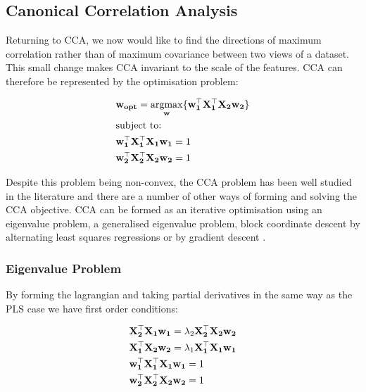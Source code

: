 \subsection{Canonical Correlation Analysis}\label{sec:cca}

Returning to CCA, we now would like to find the directions of maximum correlation rather than of maximum covariance between two views of a dataset. This small change makes CCA invariant to the scale of the features. CCA can therefore be represented by the optimisation problem:

\begin{align}
     & \bold{w_{opt}}=\underset{\bold{w}}{\mathrm{argmax}}\{ \bold{w_1^{\top}X_1^{\top}X_2w_2}  \} \\
     & \text{subject to:} \notag                                                                   \\
     & \bold{w_1^{\top}X_1^{\top}X_1w_1}=1 \notag                                                  \\
     & \bold{w_2^{\top}X_2^{\top}X_2w_2}=1 \notag
\end{align}

Despite this problem being non-convex, the CCA problem has been well studied in the literature and there are a number of other ways of forming and solving the CCA objective. CCA can be formed as an iterative optimisation using an eigenvalue problem, a generalised eigenvalue problem, block coordinate descent by alternating least squares regressions \cite{golub1995canonical} \cite{sun2008least} or by gradient descent \cite{via2007learning}.

\subsubsection{Eigenvalue Problem}

By forming the lagrangian and taking partial derivatives in the same way as the PLS case we have first order conditions:

\begin{align}\label{CCA:FOCs}
     & \bold{X_2^{\top}X_1w_1}=\lambda_2 \bold{X_2^{\top}X_2w_2} \\
     & \bold{X_1^{\top}X_2w_2}=\lambda_1 \bold{X_1^{\top}X_1w_1} \\
     & \bold{w_1^{\top}X_1^{\top}X_1w_1}=1                       \\
     & \bold{w_2^{\top}X_2^{\top}X_2w_2}=1
\end{align}

